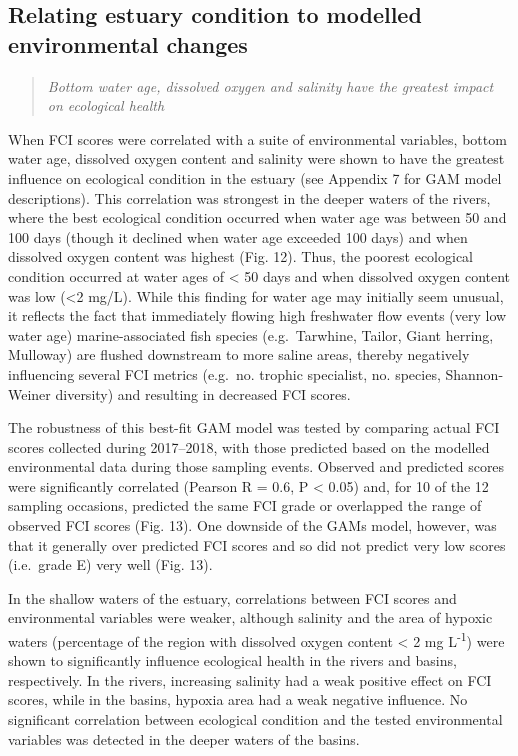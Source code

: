 \documentclass[
]{book}
\begin{document}
\hypertarget{relating-estuary-condition-to-modelled-environmental-changes-1}{%
\subsection{Relating estuary condition to modelled environmental changes}\label{relating-estuary-condition-to-modelled-environmental-changes-1}}

\begin{quote}
\emph{Bottom water age, dissolved oxygen and salinity have the greatest impact on ecological health}
\end{quote}

When FCI scores were correlated with a suite of environmental variables, bottom water age, dissolved oxygen content and salinity were shown to have the greatest influence on ecological condition in the estuary (see Appendix 7 for GAM model descriptions). This correlation was strongest in the deeper waters of the rivers, where the best ecological condition occurred when water age was between 50 and 100 days (though it declined when water age exceeded 100 days) and when dissolved oxygen content was highest (Fig. 12). Thus, the poorest ecological condition occurred at water ages of \textless{} 50 days and when dissolved oxygen content was low (\textless2 mg/L). While this finding for water age may initially seem unusual, it reflects the fact that immediately flowing high freshwater flow events (very low water age) marine-associated fish species (e.g.~Tarwhine, Tailor, Giant herring, Mulloway) are flushed downstream to more saline areas, thereby negatively influencing several FCI metrics (e.g.~no. trophic specialist, no. species, Shannon-Weiner diversity) and resulting in decreased FCI scores.~

The robustness of this best-fit GAM model was tested by comparing actual FCI scores collected during 2017--2018, with those predicted based on the modelled environmental data during those sampling events. Observed and predicted scores were significantly correlated (Pearson R = 0.6, P \textless{} 0.05) and, for 10 of the 12 sampling occasions, predicted the same FCI grade or overlapped the range of observed FCI scores (Fig. 13). One downside of the GAMs model, however, was that it generally over predicted FCI scores and so did not predict very low scores (i.e.~grade E) very well (Fig. 13).~

In the shallow waters of the estuary, correlations between FCI scores and environmental variables were weaker, although salinity and the area of hypoxic waters (percentage of the region with dissolved oxygen content \textless{} 2 mg L\textsuperscript{-1}) were shown to significantly influence ecological health in the rivers and basins, respectively. In the rivers, increasing salinity had a weak positive effect on FCI scores, while in the basins, hypoxia area had a weak negative influence. No significant correlation between ecological condition and the tested environmental variables was detected in the deeper waters of the basins.~
\end{document}
